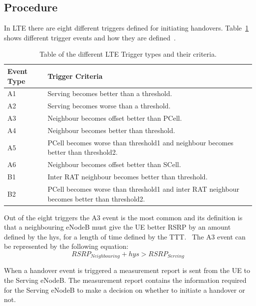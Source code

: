 \subsection{Procedure}\label{procedure}
In LTE there are eight different triggers defined for initiating handovers. Table~\ref{tab:trigger} shows different trigger events and how they are defined~\cite{3gpp2012triggers}. 
\begin{table}[H]
  \begin{center}
    \begin{tabular}{| l | p{11.1cm} |}
  	  \hline
      \textbf{Event Type} & \textbf{Trigger Criteria} \\ \hline
      A1 & Serving becomes better than a threshold. \\
      A2 & Serving becomes worse than a threshold. \\
      A3 & Neighbour becomes offset better than \ac{PCell}. \\
      A4 & Neighbour becomes better than threshold. \\
      A5 & \ac{PCell} becomes worse than threshold1 and neighbour becomes better than threshold2. \\
      A6 & Neighbour becomes offset better than \ac{SCell}. \\
      B1 & Inter RAT neighbour becomes better than threshold. \\
      B2 & \ac{PCell} becomes worse than threshold1 and inter RAT neighbour becomes better than threshold2. \\
      \hline
  	\end{tabular}
  \end{center}
  \caption{Table of the different LTE Trigger types and their criteria.}
  \label{tab:trigger}
\end{table}
Out of the eight triggers the A3 event is the most common and its definition is that a neighbouring eNodeB must give the UE better \ac{RSRP} by an amount defined by the hys, for a length of time defined by the TTT.~\cite{sinclair2013handover} The A3 event can be represented by the following equation:
\begin{equation}
RSRP_{Neighbouring} + hys > RSRP_{Serving}
\end{equation}
 
When a handover event is triggered a measurement report is sent from the UE to the Serving eNodeB. The measurement report contains the information required for the Serving eNodeB to make a decision on whether to initiate a handover or not.

